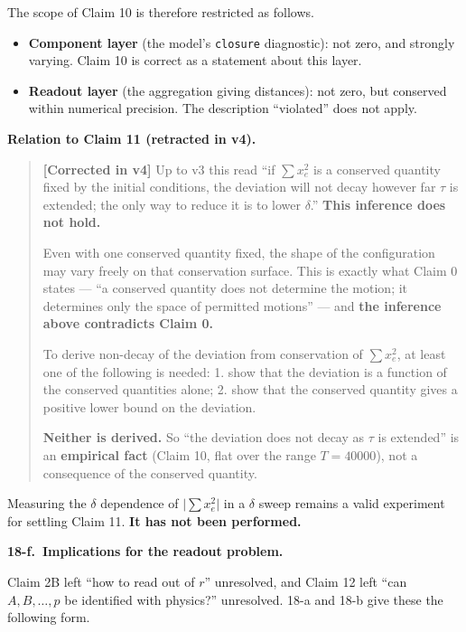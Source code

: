 \documentclass[
  10pt,
]{article}
\providecommand{\tightlist}{%
  \setlength{\itemsep}{0pt}\setlength{\parskip}{0pt}}
\begin{document}
The scope of Claim 10 is therefore restricted as follows.

\begin{itemize}
\tightlist
\item
  \textbf{Component layer} (the model's \texttt{closure} diagnostic):
  not zero, and strongly varying. Claim 10 is correct as a statement
  about this layer.
\item
  \textbf{Readout layer} (the aggregation giving distances): not zero,
  but conserved within numerical precision. The description ``violated''
  does not apply.
\end{itemize}

\textbf{Relation to Claim 11 (retracted in v4).}

\begin{quote}
\textbf{{[}Corrected in v4{]}} Up to v3 this read ``if \(\sum x_e^2\) is
a conserved quantity fixed by the initial conditions, the deviation will
not decay however far \(\tau\) is extended; the only way to reduce it is
to lower \(\delta\).'' \textbf{This inference does not hold.}

Even with one conserved quantity fixed, the shape of the configuration
may vary freely on that conservation surface. This is exactly what Claim
0 states --- ``a conserved quantity does not determine the motion; it
determines only the space of permitted motions'' --- and \textbf{the
inference above contradicts Claim 0.}

To derive non-decay of the deviation from conservation of
\(\sum x_e^2\), at least one of the following is needed: 1. show that
the deviation is a function of the conserved quantities alone; 2. show
that the conserved quantity gives a positive lower bound on the
deviation.

\textbf{Neither is derived.} So ``the deviation does not decay as
\(\tau\) is extended'' is an \textbf{empirical fact} (Claim 10, flat
over the range \(T=40000\)), not a consequence of the conserved
quantity.
\end{quote}

Measuring the \(\delta\) dependence of \(\lvert\sum x_e^2\rvert\) in a
\(\delta\) sweep remains a valid experiment for settling Claim 11.
\textbf{It has not been performed.}

\textbf{18-f.~Implications for the readout problem.}

Claim 2B left ``how to read out of \(r\)'' unresolved, and Claim 12 left
``can \(A,B,\dots,p\) be identified with physics?'' unresolved. 18-a and
18-b give these the following form.
\end{document}
